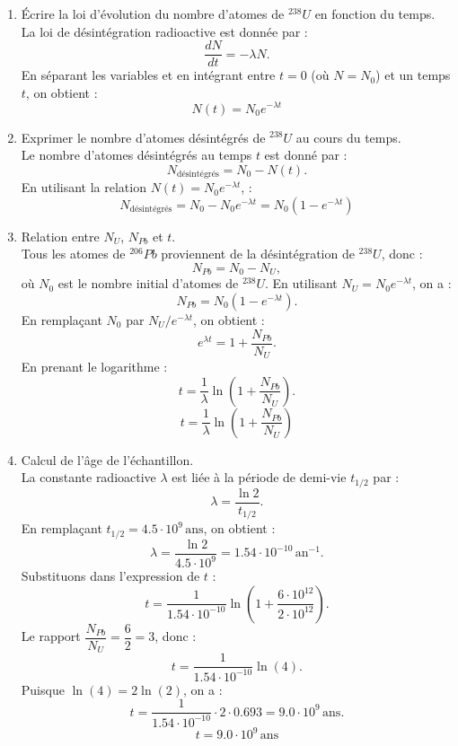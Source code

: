 \documentclass[a4paper,10pt,notitlepage,oneside]{article}
\theoremstyle{plain}
\begin{document}
\begin{enumerate}
    \item Écrire la loi d'évolution du nombre d’atomes de \(^{238}U\) en fonction du temps.\\
    La loi de désintégration radioactive est donnée par :
    \[
    \dfrac{dN}{dt} = -\lambda N.
    \]
    En séparant les variables et en intégrant entre \(t = 0\) (où \(N = N_0\)) et un temps \(t\), on obtient :
    \begin{equation*}
        \boxed{N(t) = N_0 e^{-\lambda t}}
    \end{equation*}

    \item Exprimer le nombre d’atomes désintégrés de \(^{238}U\) au cours du temps.\\
    Le nombre d'atomes désintégrés au temps \(t\) est donné par :
    \[
    N_{\text{désintégrés}} = N_0 - N(t).
    \]
    En utilisant la relation \(N(t) = N_0 e^{-\lambda t}\), :
    \begin{equation*}
        \boxed{N_{\text{désintégrés}} =N_0 - N_0 e^{-\lambda t} = N_0 (1 - e^{-\lambda t})}
    \end{equation*}

    \item Relation entre \(N_{U}\), \(N_{Pb}\) et \(t\).\\
    Tous les atomes de \(^{206}Pb\) proviennent de la désintégration de \(^{238}U\), donc :
    \[
    N_{Pb} = N_0 - N_{U},
    \]
    où \(N_0\) est le nombre initial d'atomes de \(^{238}U\). En utilisant \(N_{U} = N_0 e^{-\lambda t}\), on a :
    \[
    N_{Pb} = N_0 (1 - e^{-\lambda t}).
    \]
    En remplaçant \(N_0\) par \(N_{U} / e^{-\lambda t}\), on obtient :
    \[
    e^{\lambda t} = 1 + \dfrac{N_{Pb}}{N_{U}}.
    \]
    En prenant le logarithme :
    \[
    t = \dfrac{1}{\lambda} \ln \left( 1 + \dfrac{N_{Pb}}{N_{U}} \right).
    \]
    \begin{equation*}
        \boxed{t = \dfrac{1}{\lambda} \ln \left( 1 + \dfrac{N_{Pb}}{N_{U}} \right)}
    \end{equation*}

    \item Calcul de l’âge de l’échantillon.\\
    La constante radioactive \(\lambda\) est liée à la période de demi-vie \(t_{1/2}\) par :
    \[
    \lambda = \dfrac{\ln 2}{t_{1/2}}.
    \]
    En remplaçant \(t_{1/2} = 4.5 \cdot 10^9 \, \text{ans}\), on obtient :
    \[
    \lambda = \dfrac{\ln 2}{4.5 \cdot 10^9} = 1.54 \cdot 10^{-10} \, \text{an}^{-1}.
    \]
    Substituons dans l’expression de \(t\) :
    \[
    t = \dfrac{1}{1.54 \cdot 10^{-10}} \ln \left( 1 + \dfrac{6 \cdot 10^{12}}{2 \cdot 10^{12}} \right).
    \]
    Le rapport \(\dfrac{N_{Pb}}{N_{U}} = \dfrac{6}{2} = 3\), donc :
    \[
    t = \dfrac{1}{1.54 \cdot 10^{-10}} \ln(4).
    \]
    Puisque \(\ln(4) = 2 \ln(2)\), on a :
    \[
    t = \dfrac{1}{1.54 \cdot 10^{-10}} \cdot 2 \cdot 0.693 = 9.0 \cdot 10^9 \, \text{ans}.
    \]
    \begin{equation*}
        \boxed{t = 9.0 \cdot 10^9 \, \text{ans}}
    \end{equation*}


\end{enumerate}
\end{document}
